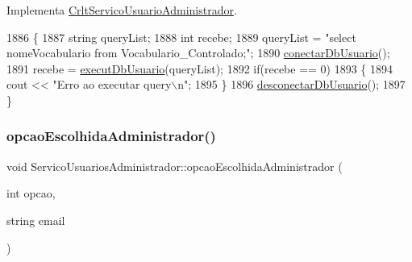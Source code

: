 Implementa \mbox{\hyperlink{class_crlt_servico_usuario_administrador_ad9ced45046d895a48f1b84b975b89cb1}{Crlt\+Servico\+Usuario\+Administrador}}.


\begin{DoxyCode}
1886 \{
1887   \textcolor{keywordtype}{string} queryList;
1888   \textcolor{keywordtype}{int} recebe;
1889   queryList = \textcolor{stringliteral}{"select nomeVocabulario from Vocabulario\_Controlado;"};
1890   \mbox{\hyperlink{comando_sql_8cpp_a4f89ddcbc4cf8f2587d89f72f8c7900d}{conectarDbUsuario}}();
1891   recebe = \mbox{\hyperlink{comando_sql_8cpp_a748197580e7f9acdbf48c78de1f7924b}{executDbUsuario}}(queryList);
1892   \textcolor{keywordflow}{if}(recebe == 0)
1893   \{
1894     cout << \textcolor{stringliteral}{"Erro ao executar query\(\backslash\)n"};
1895   \}
1896   \mbox{\hyperlink{comando_sql_8cpp_a969be9911913568e30d4ae8963338bc3}{desconectarDbUsuario}}();
1897 \}
\end{DoxyCode}
\mbox{\label{class_servico_usuarios_administrador_abf155b3f2f19bf2ab2e3329a1587c750}} 
\subsubsection{\texorpdfstring{opcao\+Escolhida\+Administrador()}{opcaoEscolhidaAdministrador()}}
{\footnotesize\ttfamily void Servico\+Usuarios\+Administrador\+::opcao\+Escolhida\+Administrador (\begin{DoxyParamCaption}\item[{int}]{opcao,  }\item[{string}]{email }\end{DoxyParamCaption})}



